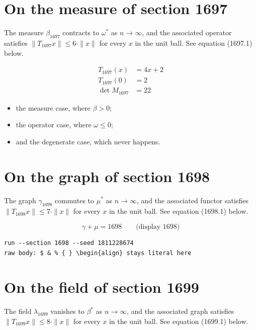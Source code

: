 \documentclass{article}
\begin{document}
\section{On the measure of section 1697}
The measure $\beta_{1697}$ contracts to $\omega^{*}$ as $n \to \infty$,
and the associated operator satisfies $\|T_{1697} x\| \leq 6 \cdot \|x\|$
for every $x$ in the unit ball. See equation (1697.1) below.

\begin{align}
T_{1697}(x) &= 4 x + 2 \\
T_{1697}(0) &= 2 \\
\det M_{1697} &= 22
\end{align}

\begin{itemize}
  \item the measure case, where $\beta > 0$;
  \item the operator case, where $\omega \leq 0$;
  \item and the degenerate case, which never happens.
\end{itemize}

\section{On the graph of section 1698}
The graph $\gamma_{1698}$ commutes to $\mu^{*}$ as $n \to \infty$,
and the associated functor satisfies $\|T_{1698} x\| \leq 7 \cdot \|x\|$
for every $x$ in the unit ball. See equation (1698.1) below.

$$
\gamma + \mu = 1698 \qquad \text{(display 1698)}
$$

\begin{verbatim}
run --section 1698 --seed 1811228674
raw body: $ & % { } \begin{align} stays literal here
\end{verbatim}

\section{On the field of section 1699}
The field $\lambda_{1699}$ vanishes to $\beta^{*}$ as $n \to \infty$,
and the associated graph satisfies $\|T_{1699} x\| \leq 8 \cdot \|x\|$
for every $x$ in the unit ball. See equation (1699.1) below.
\end{document}
